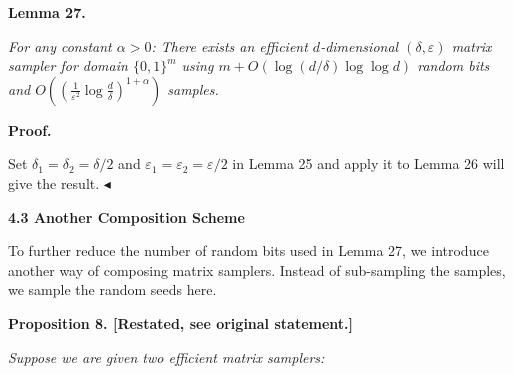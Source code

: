 

\par\medskip\noindent\textbf{
\textbf{Lemma 27}\textbf{.}
}\par



\emph{For any constant $\alpha>0$:
There exists an efficient $d$-dimensional $(\delta,\varepsilon)$ matrix sampler for domain $\{0,1\}^{m}$ using $m+O(\log(d/\delta)\log\log d)$ random bits and $O((\frac{1}{\varepsilon^{2}}\log\frac{d}{\delta})^{1+\alpha})$ samples.}\par







\par\medskip\noindent\textbf{Proof.}\par




Set $\delta_{1}=\delta_{2}=\delta/2$ and $\varepsilon_{1}=\varepsilon_{2}=\varepsilon/2$ in Lemma 25 and apply it to Lemma 26 will give the result.
$\blacktriangleleft$\par






\par\medskip\noindent\textbf{
4.3 Another Composition Scheme}\par




To further reduce the number of random bits used in Lemma 27, we introduce another way of composing matrix samplers.
Instead of sub-sampling the samples, we sample the random seeds here.\par






\par\medskip\noindent\textbf{
\textbf{Proposition 8}\textbf{.}
[Restated, see original statement.]}\par



\emph{Suppose we are given two efficient matrix samplers:}\par


